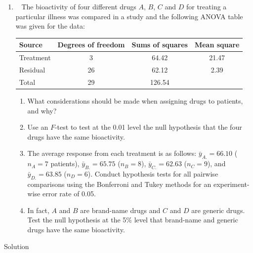\documentclass[
]{book}
\theoremstyle{definition}
\theoremstyle{definition}
\theoremstyle{definition}
\theoremstyle{definition}
\theoremstyle{remark}
\begin{document}
\begin{enumerate}
\def\labelenumi{\arabic{enumi}.}
\setcounter{enumi}{1}
\item
  ~\citep[Adapted from][]{WH2009} The bioactivity of four different drugs \(A\), \(B\), \(C\) and \(D\) for treating a particular illness was compared in a study and the following ANOVA table was given for the data:

  \begin{longtable}[]{@{}lccc@{}}
  \toprule()
  Source & Degrees of freedom & Sums of squares & Mean square \\
  \midrule()
  \endhead
  Treatment & 3 & 64.42 & 21.47 \\
  Residual & 26 & 62.12 & 2.39 \\
  Total & 29 & 126.54 & \\
  \bottomrule()
  \end{longtable}

  \begin{enumerate}
  \def\labelenumii{\roman{enumii}.}
  \item
    What considerations should be made when assigning drugs to patients, and why?
  \item
    Use an \(F\)-test to test at the 0.01 level the null hypothesis that the four drugs have the same bioactivity.
  \item
    The average response from each treatment is as follows: \(\bar{y}_{A.}=66.10\) (\(n_A=7\) patients), \(\bar{y}_{B.}=65.75\) (\(n_B=8\)), \(\bar{y}_{C.} = 62.63\) (\(n_C=9\)), and \(\bar{y}_{D.}=63.85\) (\(n_D=6\)). Conduct hypothesis tests for all pairwise comparisons using the Bonferroni and Tukey methods for an experiment-wise error rate of 0.05.
  \item
    In fact, \(A\) and \(B\) are brand-name drugs and \(C\) and \(D\) are generic drugs. Test the null hypothesis at the 5\% level that brand-name and generic drugs have the same bioactivity.
  \end{enumerate}
\end{enumerate}

Solution
\end{document}
